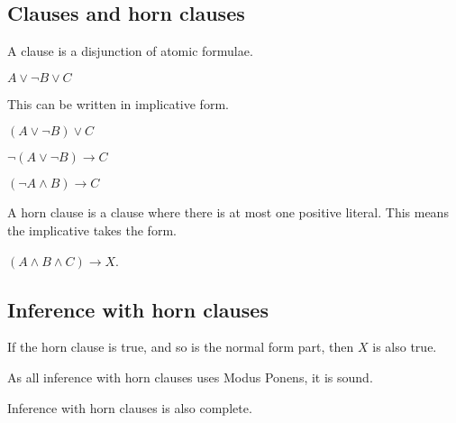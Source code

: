 \subsection{Clauses and horn clauses}

A clause is a disjunction of atomic formulae.

\(A\lor \neg B\lor C\)

This can be written in implicative form.

\((A\lor \neg B)\lor C\)

\(\neg (A\lor \neg B)\rightarrow C\)

\((\neg A\land B)\rightarrow C\)

A horn clause is a clause where there is at most one positive literal. This means the implicative takes the form.

\((A\land B\land C )\rightarrow X\).

\subsection{Inference with horn clauses}

If the horn clause is true, and so is the normal form part, then \(X\) is also true.

As all inference with horn clauses uses Modus Ponens, it is sound.

Inference with horn clauses is also complete.


